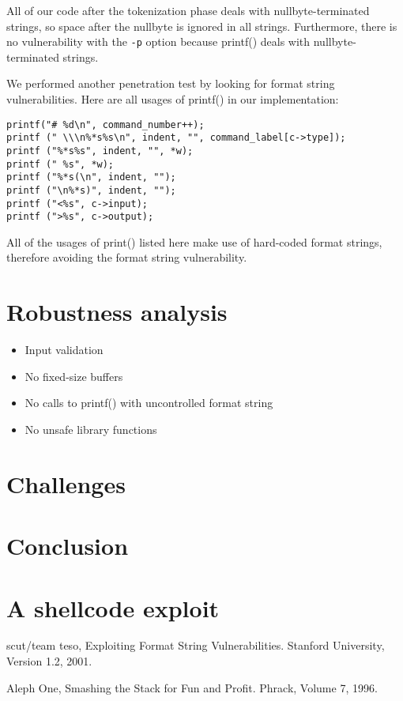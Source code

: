 \documentclass[12pt]{article}
\begin{document}
All of our code after the tokenization phase deals with nullbyte-terminated strings, so space after the nullbyte is ignored in all strings. Furthermore, there is no vulnerability with the \texttt{-p} option because printf() deals with nullbyte-terminated strings.

We performed another penetration test by looking for format string vulnerabilities. Here are all usages of printf() in our implementation:

\begin{lstlisting}[frame=single]
printf("# %d\n", command_number++);
printf (" \\\n%*s%s\n", indent, "", command_label[c->type]);
printf ("%*s%s", indent, "", *w);
printf (" %s", *w);
printf ("%*s(\n", indent, "");
printf ("\n%*s)", indent, "");
printf ("<%s", c->input);
printf (">%s", c->output);
\end{lstlisting}

All of the usages of print() listed here make use of hard-coded format strings, therefore avoiding the format string vulnerability.

\section{Robustness analysis}
\begin{itemize}
  \item Input validation
  \item No fixed-size buffers
  \item No calls to printf() with uncontrolled format string
  \item No unsafe library functions
\end{itemize}

\section{Challenges}

\section{Conclusion}

\appendix
\section{A shellcode exploit}

\begin{thebibliography}{9}

  scut/team teso,
  Exploiting Format String Vulnerabilities.
  Stanford University,
  Version 1.2,
  2001.

  Aleph One,
  Smashing the Stack for Fun and Profit.
  Phrack,
  Volume 7,
  1996.
\end{thebibliography}
\end{document}
